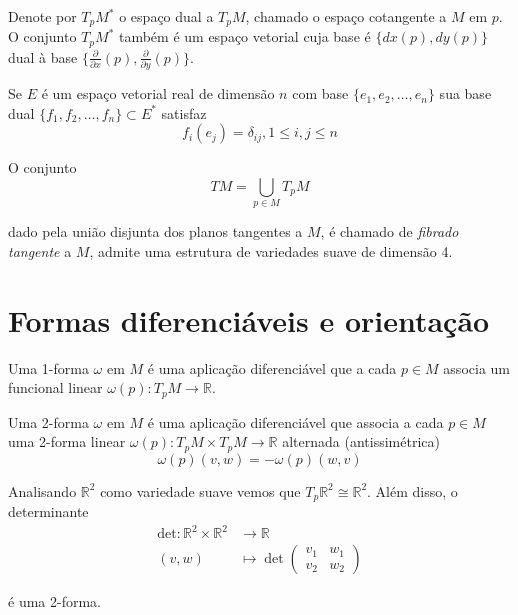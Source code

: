 \begin{obse}
	Denote por $T_p M^*$ o espaço dual a $T_p M$, chamado o espaço cotangente a $M$ em $p$. O conjunto $T_p M^*$ também é um espaço vetorial cuja base é $\{ dx(p), dy(p)  \}$ dual à base $\{ \frac{\partial}{\partial x}(p), \frac{\partial}{\partial y}(p) \}$.
\end{obse}

\begin{lembrete}
	Se $E$ é um espaço vetorial real de dimensão $n$ com base $\{ e_1, e_2, \ldots, e_n \}$ sua base dual $\{ f_1, f_2, \ldots, f_n \} \subset E^*$ satisfaz
	\begin{equation*}
		f_i (e_j) = \delta_{ij}, 1 \leq i,j \leq n
	\end{equation*}
\end{lembrete}

	O conjunto
	\begin{equation*}
		TM = \bigcup_{p \in M} T_p M
	\end{equation*}
	
	dado pela união disjunta dos planos tangentes a $M$, é chamado de \emph{fibrado tangente} a $M$, admite uma estrutura de variedades suave de dimensão 4.
	
	
\section{Formas diferenciáveis e orientação}

\begin{defi}
	Uma 1-forma $\omega$ em $M$ é uma aplicação diferenciável que a cada $p \in M$ associa um funcional linear $\omega(p): T_p M \rightarrow \mathbb{R}$.
\end{defi}

\begin{defi}
	Uma 2-forma $\omega$ em $M$ é uma aplicação diferenciável que associa a cada $p \in M$ uma 2-forma linear $\omega(p): T_p M \times T_p M \rightarrow \mathbb{R}$ alternada (antissimétrica)
	\begin{equation*}
		\omega(p) (v,w) = - \omega(p) (w,v) 
	\end{equation*}
\end{defi}

\begin{exemplo}
	Analisando $\mathbb{R}^2$ como variedade suave vemos que $T_p \mathbb{R}^2 \cong \mathbb{R}^2$. Além disso, o determinante
	\begin{align*}
		\text{det}: \mathbb{R}^2 \times \mathbb{R}^2 &\rightarrow \mathbb{R}\\
		(v,w) & \mapsto \det \left( \begin{matrix}
		v_1 & w_1\\
		v_2 & w_2
		\end{matrix} \right)
	\end{align*}
	
	é uma 2-forma.
\end{exemplo}

